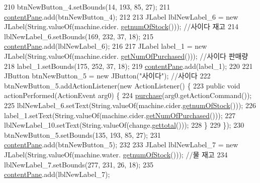 \begin{DoxyCode}
210         btnNewButton\_4.setBounds(14, 193, 85, 27);
211         \hyperlink{class_vending_machine_1_1_machine_u_i_ac8ef25585e46da798d067af0eefa1a03}{contentPane}.add(btnNewButton\_4);
212                 
213         JLabel lblNewLabel\_6 = \textcolor{keyword}{new} JLabel(String.valueOf(machine.cider.
      \hyperlink{class_vending_machine_1_1_product_a199bec8565bf69e9231248a49076a01b}{getnumOfStock}())); \textcolor{comment}{//사이다 재고}
214         lblNewLabel\_6.setBounds(169, 232, 37, 18);
215         \hyperlink{class_vending_machine_1_1_machine_u_i_ac8ef25585e46da798d067af0eefa1a03}{contentPane}.add(lblNewLabel\_6);      
216         
217         JLabel label\_1 = \textcolor{keyword}{new} JLabel(String.valueOf(machine.cider.
      \hyperlink{class_vending_machine_1_1_product_aefa8a5881c5569171a8cf1161b4bd911}{getNumOfPurchased}())); \textcolor{comment}{//사이다 판매량}
218         label\_1.setBounds(175, 252, 37, 18);
219         \hyperlink{class_vending_machine_1_1_machine_u_i_ac8ef25585e46da798d067af0eefa1a03}{contentPane}.add(label\_1);
220 
221         JButton btnNewButton\_5 = \textcolor{keyword}{new} JButton(\textcolor{stringliteral}{"사이다"}); \textcolor{comment}{//사이다}
222         btnNewButton\_5.addActionListener(\textcolor{keyword}{new} ActionListener() \{
223             \textcolor{keyword}{public} \textcolor{keywordtype}{void} actionPerformed(ActionEvent arg0) \{
224                 \hyperlink{class_vending_machine_1_1_machine_u_i_aadccf593dc69281c9ebbfe1fbe09b804}{purchase}(arg0.getActionCommand());
225                 lblNewLabel\_6.setText(String.valueOf(machine.cider.\hyperlink{class_vending_machine_1_1_product_a199bec8565bf69e9231248a49076a01b}{getnumOfStock}()));
226                 label\_1.setText(String.valueOf(machine.cider.\hyperlink{class_vending_machine_1_1_product_aefa8a5881c5569171a8cf1161b4bd911}{getNumOfPurchased}()));
227                 lblNewLabel\_10.setText(String.valueOf(change.\hyperlink{class_vending_machine_1_1_change_a07a32d7240178343fa1273d075d73c64}{gettotal}()));
228             \}
229         \});
230         btnNewButton\_5.setBounds(135, 193, 85, 27);
231         \hyperlink{class_vending_machine_1_1_machine_u_i_ac8ef25585e46da798d067af0eefa1a03}{contentPane}.add(btnNewButton\_5);
232         
233         JLabel lblNewLabel\_7 = \textcolor{keyword}{new} JLabel(String.valueOf(machine.water.
      \hyperlink{class_vending_machine_1_1_product_a199bec8565bf69e9231248a49076a01b}{getnumOfStock}())); \textcolor{comment}{//물 재고}
234         lblNewLabel\_7.setBounds(277, 231, 26, 18);
235         \hyperlink{class_vending_machine_1_1_machine_u_i_ac8ef25585e46da798d067af0eefa1a03}{contentPane}.add(lblNewLabel\_7);      

\end{DoxyCode}
